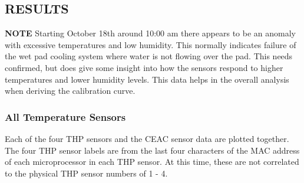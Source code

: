 \documentclass[
  letterpaper,
  DIV=11,
  numbers=noendperiod]{scrartcl}
\begin{document}
\hypertarget{results}{%
\subsection{RESULTS}\label{results}}

\textbf{NOTE} Starting October 18th around 10:00 am there appears to be
an anomaly with excessive temperatures and low humidity. This normally
indicates failure of the wet pad cooling system where water is not
flowing over the pad. This needs confirmed, but does give some insight
into how the sensors respond to higher temperatures and lower humidity
levels. This data helps in the overall analysis when deriving the
calibration curve.

\hypertarget{all-temperature-sensors}{%
\subsubsection{All Temperature Sensors}\label{all-temperature-sensors}}

Each of the four THP sensors and the CEAC sensor data are plotted
together.\\
The four THP sensor labels are from the last four characters of the MAC
address of each microprocessor in each THP sensor. At this time, these
are not correlated to the physical THP sensor numbers of 1 - 4.
\end{document}
